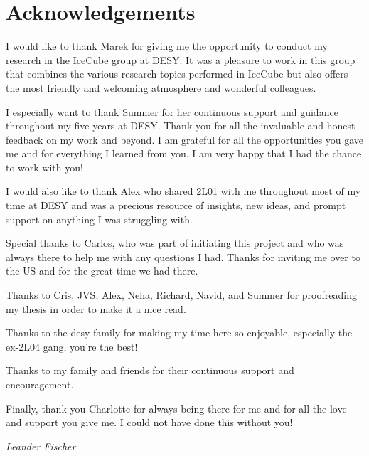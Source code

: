 \chapter*{Acknowledgements}

I would like to thank Marek for giving me the opportunity to conduct my research in the IceCube group at DESY. It was a pleasure to work in this group that combines the various research topics performed in IceCube but also offers the most friendly and welcoming atmosphere and wonderful colleagues.

I especially want to thank Summer for her continuous support and guidance throughout my five years at DESY. Thank you for all the invaluable and honest feedback on my work and beyond. I am grateful for all the opportunities you gave me and for everything I learned from you. I am very happy that I had the chance to work with you!

I would also like to thank Alex who shared 2L01 with me throughout most of my time at DESY and was a precious resource of insights, new ideas, and prompt support on anything I was struggling with.

Special thanks to Carlos, who was part of initiating this project and who was always there to help me with any questions I had. Thanks for inviting me over to the US and for the great time we had there.

Thanks to Cris, JVS, Alex, Neha, Richard, Navid, and Summer for proofreading my thesis in order to make it a nice read.

Thanks to the desy family for making my time here so enjoyable, especially the ex-2L04 gang, you're the best!

Thanks to my family and friends for their continuous support and encouragement. 

Finally, thank you Charlotte for always being there for me and for all the love and support you give me. I could not have done this without you!


\begin{flushright}
	\textit{Leander Fischer}
\end{flushright}
